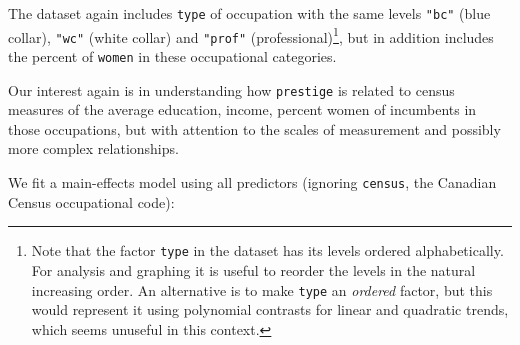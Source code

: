 \documentclass[
  letterpaper,
  10pt,
  krantz2]{krantz}
\makeatletter
\newenvironment{Shaded}{\begin{snugshade}}{\end{snugshade}}
\newcommand{\AttributeTok}[1]{\textcolor[rgb]{0.40,0.45,0.13}{#1}}
\newcommand{\CommentTok}[1]{\textcolor[rgb]{0.37,0.37,0.37}{#1}}
\newcommand{\FunctionTok}[1]{\textcolor[rgb]{0.28,0.35,0.67}{#1}}
\newcommand{\NormalTok}[1]{\textcolor[rgb]{0.00,0.23,0.31}{#1}}
\newcommand{\OtherTok}[1]{\textcolor[rgb]{0.00,0.23,0.31}{#1}}
\newcommand{\SpecialCharTok}[1]{\textcolor[rgb]{0.37,0.37,0.37}{#1}}
\newcommand{\StringTok}[1]{\textcolor[rgb]{0.13,0.47,0.30}{#1}}
\newenvironment{kframe}{%
  \medskip{}
  \setlength{\fboxsep}{.8em}
  \def\at@end@of@kframe{}%
  \ifinner\ifhmode%
  \def\at@end@of@kframe{\end{minipage}}%
  \begin{minipage}{\columnwidth}%
  \fi\fi%
  \def\FrameCommand##1{\hskip\@totalleftmargin \hskip-\fboxsep
  \colorbox{shadecolor}{##1}\hskip-\fboxsep
      \hskip-\linewidth \hskip-\@totalleftmargin \hskip\columnwidth}%
  \MakeFramed {\advance\hsize-\width
    \@totalleftmargin\z@ \linewidth\hsize
    \@setminipage}}%
{\par\unskip\endMakeFramed%
  \at@end@of@kframe}
\renewenvironment{Shaded}{\begin{kframe}}{\end{kframe}}
\makeatother
\begin{document}
The dataset again includes \texttt{type} of occupation with the same
levels \texttt{"bc"} (blue collar), \texttt{"wc"} (white collar) and
\texttt{"prof"} (professional)\footnote{Note that the factor
  \texttt{type} in the dataset has its levels ordered alphabetically.
  For analysis and graphing it is useful to reorder the levels in the
  natural increasing order. An alternative is to make \texttt{type} an
  \emph{ordered} factor, but this would represent it using polynomial
  contrasts for linear and quadratic trends, which seems unuseful in
  this context.}, but in addition includes the percent of \texttt{women}
in these occupational categories.

Our interest again is in understanding how \texttt{prestige} is related
to census measures of the average education, income, percent women of
incumbents in those occupations, but with attention to the scales of
measurement and possibly more complex relationships.

\begin{Shaded}
\end{Shaded}

We fit a main-effects model using all predictors (ignoring
\texttt{census}, the Canadian Census occupational code):
\end{document}
